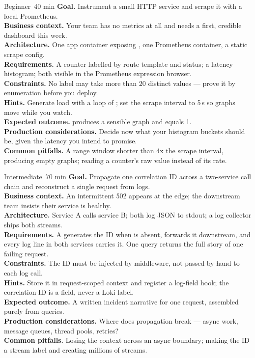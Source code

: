 
\begin{minilab}{Beginner}{~40 min}
\textbf{Goal.} Instrument a small HTTP service and scrape it with a local Prometheus.\\
\textbf{Business context.} Your team has no metrics at all and needs a first, credible dashboard this week.\\
\textbf{Architecture.} One app container exposing , one Prometheus container, a static scrape config.\\
\textbf{Requirements.} A counter labelled by route template and status; a latency histogram; both visible in the Prometheus expression browser.\\
\textbf{Constraints.} No label may take more than 20 distinct values --- prove it by enumeration before you deploy.\\
\textbf{Hints.} Generate load with a loop of ; set the scrape interval to 5\,s so graphs move while you watch.\\
\textbf{Expected outcome.}  produces a sensible graph and  equals 1.\\
\textbf{Production considerations.} Decide now what your histogram buckets should be, given the latency you intend to promise.\\
\textbf{Common pitfalls.} A range window shorter than 4x the scrape interval, producing empty graphs; reading a counter's raw value instead of its rate.
\end{minilab}

\begin{minilab}{Intermediate}{~70 min}
\textbf{Goal.} Propagate one correlation ID across a two-service call chain and reconstruct a single request from logs.\\
\textbf{Business context.} An intermittent 502 appears at the edge; the downstream team insists their service is healthy.\\
\textbf{Architecture.} Service A calls service B; both log JSON to stdout; a log collector ships both streams.\\
\textbf{Requirements.} A generates the ID when  is absent, forwards it downstream, and every log line in both services carries it. One query returns the full story of one failing request.\\
\textbf{Constraints.} The ID must be injected by middleware, not passed by hand to each log call.\\
\textbf{Hints.} Store it in request-scoped context and register a log-field hook; the correlation ID is a field, never a Loki label.\\
\textbf{Expected outcome.} A written incident narrative for one request, assembled purely from queries.\\
\textbf{Production considerations.} Where does propagation break --- async work, message queues, thread pools, retries?\\
\textbf{Common pitfalls.} Losing the context across an async boundary; making the ID a stream label and creating millions of streams.
\end{minilab}

